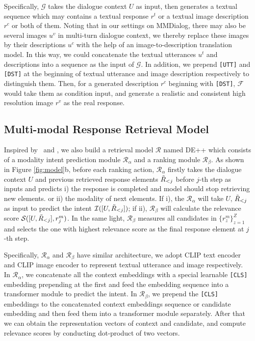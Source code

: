 \documentclass[11pt]{article}
\newcommand{\DataName}{MMDialog}
\begin{document}
Specifically, $\mathcal{G}$ takes the dialogue context  $U$ as input, then generates a textual sequence which may contains a textual response  $r^t$ or a textual image description $r^c$ or both of them. Noting that in our settings on \DataName, there may also be several images $u^v$ in multi-turn dialogue context, we thereby replace these images by their descriptions $u^c$ with the help of an image-to-description translation model. In this way, we could concatenate the textual utterances $u^t$ and descriptions into a sequence as the input of $\mathcal{G}$. In addition, we prepend \texttt{[UTT]} and \texttt{[DST]} at the beginning of textual utterance and image description respectively to distinguish them. Then, for a generated   description $r^c$ beginning with \texttt{[DST]}, $\mathcal{F}$ would take them as condition input, and generate a realistic and consistent high resolution image $r^v$ as the real response. 


\subsection{Multi-modal Response Retrieval Model}
Inspired by~\citet{parekh-etal-2021-crisscrossed} and \citet{zang-etal-2021-photochat}, we also build a retrieval model $\mathcal{R}$ named DE++ which consists of a modality intent prediction module $\mathcal{R}_\alpha$ and a ranking module $\mathcal{R}_\beta$. As shown in Figure \ref{fig:model}b, before each ranking action, $\mathcal{R}_\alpha$ firstly takes the dialogue context $U$ and previous retrieved response elements $\Tilde{R}_{<j}$ before $j$-th step as inputs and predicts i) the response is completed and model should stop retrieving new elements. or ii) the modality of next elements. If i), the $\mathcal{R}_\alpha$ will take $U$, $\Tilde{R}_{<j}$ as input to predict the intent $\mathcal{I} ([U,\Tilde{R}_{<j}])$; if ii), $\mathcal{R}_\beta$ will calculate the relevance score  $\mathcal{S} ([U,\Tilde{R}_{<j}], r^{m}_j)$. In the same light,  $\mathcal{R}_\beta$ measures all candidates in  $\{r^{m}_z\}_{z=1}^{Z}$ and selects the one with highest relevance score as the final response element at $j$-th step.




Specifically, $\mathcal{R}_\alpha$ and $\mathcal{R}_\beta$ have similar architecture, we adopt CLIP text encoder and CLIP image encoder to represent textual utterance and image respectively. In $\mathcal{R}_\alpha$, we concatenate all the context embeddings with a special learnable \texttt{[CLS]} embedding prepending at the first and feed the embedding sequence into a transformer module to predict the intent. In $\mathcal{R}_\beta$, we prepend the \texttt{[CLS]} embeddings to the concatenated context embeddings sequence or candidate embedding and then feed them into a transformer module separately. After that we can obtain the representation vectors of context and candidate, and compute relevance scores by conducting dot-product of two vectors.
\end{document}

